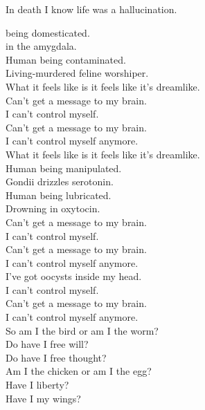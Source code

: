 In death I know life was a hallucination. \\




 being domesticated. \\
 in the amygdala. \\
Human being contaminated. \\
Living-murdered feline worshiper. \\

What it feels like is it feels like it's dreamlike. \\

Can't get a message to my brain. \\
I can't control myself. \\
Can't get a message to my brain. \\
I can't control myself anymore. \\

What it feels like is it feels like it's dreamlike. \\

Human being manipulated. \\
Gondii drizzles serotonin. \\
Human being lubricated. \\
Drowning in oxytocin. \\

Can't get a message to my brain. \\
I can't control myself. \\
Can't get a message to my brain. \\
I can't control myself anymore. \\
I've got oocysts inside my head. \\
I can't control myself. \\
Can't get a message to my brain. \\
I can't control myself anymore. \\

So am I the bird or am I the worm? \\
Do have I free will? \\
Do have I free thought? \\

Am I the chicken or am I the egg? \\
Have I liberty? \\
Have I my wings? \\

